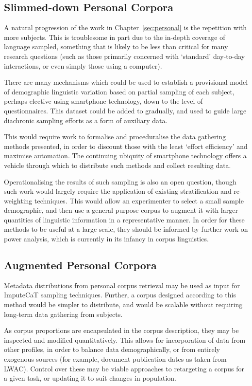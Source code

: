 \subsection{Slimmed-down Personal Corpora}
A natural progression of the work in Chapter~\ref{sec:personal} is the repetition with more subjects.  This is troublesome in part due to the in-depth coverage of language sampled, something that is likely to be less than critical for many research questions (such as those primarily concerned with `standard' day-to-day interactions, or even simply those using a computer).

There are many mechanisms which could be used to establish a provisional model of demographic linguistic variation based on partial sampling of each subject, perhaps elective using smartphone technology, down to the level of questionnaires.  This dataset could be added to gradually, and used to guide large diachronic sampling efforts as a form of auxiliary data.

This would require work to formalise and proceduralise the data gathering methods presented, in order to discount those with the least `effort efficiency' and maximise automation.  The continuing ubiquity of smartphone technology offers a vehicle through which to distribute such methods and collect resulting data.

Operationalising the results of such sampling is also an open question, though such work would largely require the application of existing stratification and re-weighting techniques.  This would allow an experimenter to select a small sample demographic, and then use a general-purpose corpus to augment it with larger quantities of linguistic information in a representative manner.  In order for these methods to be useful at a large scale, they should be informed by further work on power analysis, which is currently in its infancy in corpus linguistics.


\subsection{Augmented Personal Corpora}
Metadata distributions from personal corpus retrieval may be used as input for ImputeCaT sampling techniques.  Further, a corpus designed according to this method would be simpler to distribute, and would be scalable without requiring long-term data gathering from subjects.

As corpus proportions are encapsulated in the corpus description, they may be inspected and modified quantitatively.  This allows for incorporation of data from other profiles, in order to balance data demographically, or from entirely exogenous sources (for example, document publication dates as taken from LWAC).  Control over these may be viable approaches to retargeting a corpus for a given task, or updating it to suit changes in population.

